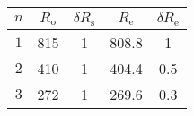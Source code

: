 \begin{tabular}{ccccc}
    \hline
    $n$ & $R_\text{o}$   & $\delta R_\text{s}$  & $R_\text{e}$  & $\delta R_\text{e}$ \\
    \hline\hline
    $1$ & \num{815}      & \num{1}              & \num{808.8}   &  \num{1}            \\
    $2$ & \num{410}      & \num{1}              & \num{404.4}   &  \num{0.5}          \\
    $3$ & \num{272}      & \num{1}              & \num{269.6}   &  \num{0.3}          \\
    \hline
\end{tabular}